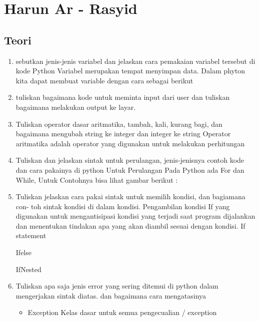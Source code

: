 ﻿\section{Harun Ar - Rasyid}
\subsection{Teori}
\begin{enumerate}
    \item sebutkan jenis-jenis variabel dan jelaskan cara pemakaian variabel tersebut di
    kode Python
    Variabel merupakan tempat menyimpan data. Dalam phyton kita dapat membuat variable dengan cara sebagai berikut
    

    \item tuliskan bagaimana kode untuk meminta input dari user dan tuliskan bagaimana
    melakukan output ke layar.
    

    \item Tuliskan operator dasar aritmatika, tambah, kali, kurang bagi, dan bagaimana
    mengubah string ke integer dan integer ke string
    Operator  aritmatika adalah operator yang digunakan untuk melakukan perhitungan
    

    \item Tuliskan dan jelaskan sintak untuk perulangan, jenis-jenisnya contoh kode dan
    cara pakainya di python
    Untuk Perulangan Pada Python ada For dan While, Untuk Contohnya bisa lihat gambar berikut :
    

    \item Tuliskan jelaskan cara pakai sintak untuk memilih kondisi, dan bagiamana con-
    toh sintak kondisi di dalam kondisi.
    Pengambilan kondisi If yang digunakan untuk mengantisipasi kondisi yang terjadi saat program dijalankan dan menentukan tindakan apa yang akan diambil sesuai dengan kondisi.
    If statement
    
    
    Ifelse
    
    
    IfNested
    

    \item Tuliskan apa saja jenis error yang sering ditemui di python dalam mengerjakan
    sintak diatas. dan bagaimana cara mengatasinya
    \begin{itemize}
        \item Exception
        Kelas dasar untuk semua pengecualian / exception


\end{itemize}
\end{enumerate}
